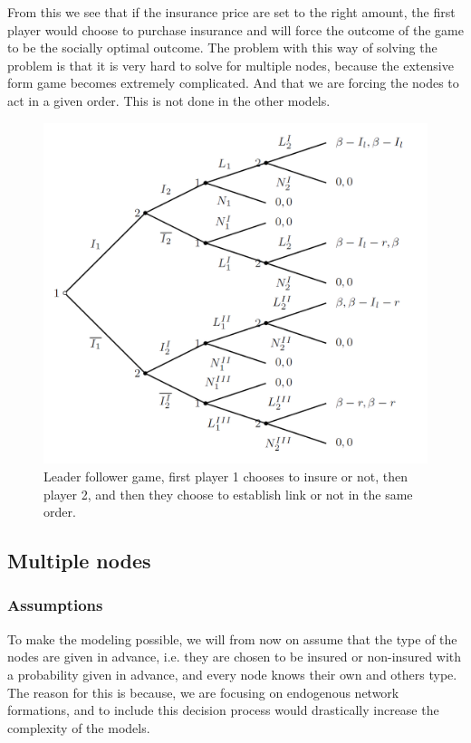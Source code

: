 From this we see that if the insurance price are set to the right amount, the first player would choose to purchase insurance and will force the outcome of the game to be the socially optimal outcome. 
The problem with this way of solving the problem is that it is very hard to solve for  multiple nodes, because the extensive form game becomes extremely complicated. And that we are forcing the nodes to act in a given order. This is not done in the other models.
 

\begin{figure}[h]
\centering
  \includegraphics[width=0.9\linewidth]{../Figures/stackelberggame.png}
  \caption{\label{fig:stackelberg} Leader follower game, first player 1 chooses to insure or not, then player 2, and then they choose to establish link or not in the same order.}
\end{figure}


\subsection{Multiple nodes}
\subsubsection{Assumptions}
To make the modeling possible, we will from now on assume that the type of the nodes are given in advance, i.e. they are chosen to be insured or non-insured with a probability given in advance, and every node knows their own and others type. The reason for this is because, we are focusing on endogenous network formations, and to include this decision process would drastically increase the complexity of the models. 

